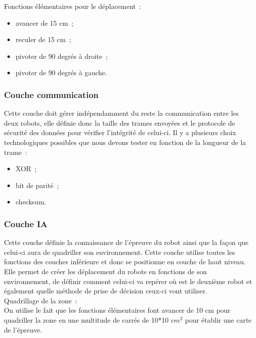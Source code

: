 \documentclass{article}
\begin{document}
Fonctions élémentaires pour le déplacement~: \\

\begin{itemize}
  \item avancer de 15 cm~;
  \item reculer de 15 cm~;
  \item pivoter de 90 degrés à droite~;
  \item pivoter de 90 degrés à gauche.
\end{itemize}

\subsubsection{Couche communication}

Cette couche doit gérer indépendamment du reste la communication entre les deux robots, elle définie donc la taille des trames envoyées et le protocole de sécurité des données pour vérifier l’intégrité de celui-ci. Il y a plusieurs choix technologiques possibles que nous devons tester en fonction de la longueur de la trame~: \\

\begin{itemize}
  \item XOR~;
  \item bit de parité~;
  \item checksum.
\end{itemize}

\subsubsection{Couche IA}

Cette couche définie la connaissance de l’épreuve du robot ainsi que la façon que celui-ci aura de quadriller son environnement. Cette couche utilise toutes les fonctions des couches inférieure et donc se positionne en couche de haut niveau. Elle permet de créer les déplacement du robots en fonctions de son environnement, de définir comment celui-ci va repérer où est le deuxième robot et également quelle méthode de prise de décision ceux-ci vont utiliser. \\

Quadrillage de la zone~:\\

On utilise le fait que les fonctions élémentaires font avancer de 10 cm pour quadriller la zone en une multitude de carrés de 10*10 $cm^2$ pour établir une carte de l’épreuve. \\
\end{document}
